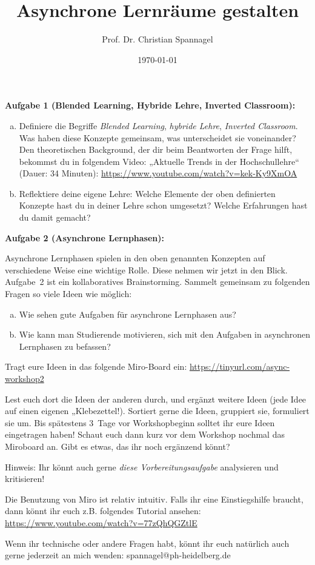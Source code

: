 \documentclass{../cssheet}
\title{Asynchrone Lernräume gestalten}
\author{Prof. Dr. Christian Spannagel}
\date{\today}
\begin{document}
\printtitle
\printsubtitle

\textbf{Aufgabe 1 (Blended Learning, Hybride Lehre, Inverted Classroom):} 

\begin{enumerate}[a)]
\item Definiere die Begriffe \emph{Blended Learning}, \emph{hybride Lehre}, \emph{Inverted Classroom}. Was haben diese Konzepte gemeinsam, was unterscheidet sie voneinander?
Den theoretischen Background, der dir beim Beantworten der Frage hilft, bekommst du in folgendem Video: „Aktuelle Trends in der Hochschullehre“ (Dauer: 34 Minuten): \url{https://www.youtube.com/watch?v=kek-Ky9XmOA}
\item Reflektiere deine eigene Lehre: Welche Elemente der oben definierten Konzepte hast du in deiner Lehre schon umgesetzt? Welche Erfahrungen hast du damit gemacht?
\end{enumerate}


\textbf{Aufgabe 2 (Asynchrone Lernphasen):} 

Asynchrone Lernphasen spielen in den oben genannten Konzepten auf verschiedene Weise eine wichtige Rolle. Diese nehmen wir jetzt in den Blick. Aufgabe~2 ist ein kollaboratives Brainstorming. Sammelt gemeinsam zu folgenden Fragen so viele Ideen wie möglich:

\begin{enumerate}[a)]
\item Wie sehen gute Aufgaben für asynchrone Lernphasen aus?
\item Wie kann man Studierende motivieren, sich mit den Aufgaben in asynchronen Lernphasen zu befassen?
\end{enumerate}

Tragt eure Ideen in das folgende Miro-Board ein: \url{https://tinyurl.com/async-workshop2}

Lest euch dort die Ideen der anderen durch, und ergänzt weitere Ideen (jede Idee auf einen eigenen „Klebezettel!). Sortiert gerne die Ideen, gruppiert sie, formuliert sie um. Bis spätestens 3~Tage vor Workshopbeginn solltet ihr eure Ideen eingetragen haben! Schaut euch dann kurz vor dem Workshop nochmal das Miroboard an. Gibt es etwas, das ihr noch ergänzend könnt? 

Hinweis: Ihr könnt auch gerne \emph{diese Vorbereitungsaufgabe} analysieren und kritisieren!

Die Benutzung von Miro ist relativ intuitiv. Falls ihr eine Einstiegshilfe braucht, dann könnt ihr euch z.B. folgendes Tutorial ansehen: \url{https://www.youtube.com/watch?v=77zQhQGZtlE}

Wenn ihr technische oder andere Fragen habt, könnt ihr euch natürlich auch gerne jederzeit an mich wenden: spannagel@ph-heidelberg.de 


\vspace*{10mm}
\printlicense

\printsocials


\end{document}
